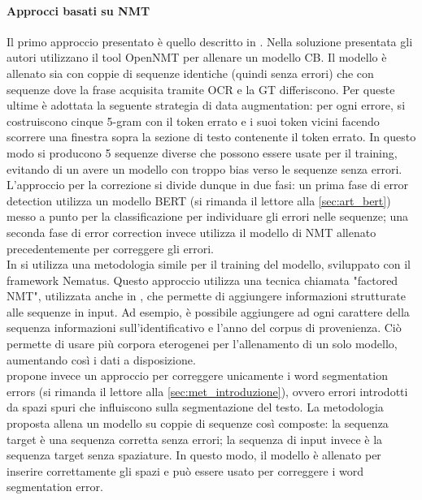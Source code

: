 \paragraph{Approcci basati su NMT}
Il primo approccio presentato è quello descritto in \cite{nguyen2020neural}. Nella soluzione presentata gli autori utilizzano il tool OpenNMT\cite{klein2017opennmt} per allenare un modello CB. Il modello è allenato sia con coppie di sequenze identiche (quindi senza errori) che con sequenze dove la frase acquisita tramite OCR e la GT differiscono. Per queste ultime è adottata la seguente strategia di data augmentation: per ogni errore, si costruiscono cinque 5-gram con il token errato e i suoi token vicini facendo scorrere una finestra sopra la sezione di testo contenente il token errato. In questo modo si producono 5 sequenze diverse che possono essere usate per il training, evitando di un avere un modello con troppo bias verso le sequenze senza errori. L'approccio per la correzione si divide dunque in due fasi: un prima fase di error detection utilizza un modello BERT (si rimanda il lettore alla \autoref{sec:art_bert}) messo a punto per la classificazione per individuare gli errori nelle sequenze; una seconda fase di error correction invece utilizza il modello di NMT allenato precedentemente per correggere gli errori.\\
In \cite{amrhein2018supervised} si utilizza una metodologia simile per il training del modello, sviluppato con il framework Nematus\cite{sennrich2017nematus}. Questo approccio utilizza una tecnica chiamata "factored NMT", utilizzata anche in \cite{nguyen2020neural}, che permette di aggiungere informazioni strutturate alle sequenze in input. Ad esempio, è possibile aggiungere ad ogni carattere della sequenza informazioni sull'identificativo e l'anno del corpus di provenienza. Ciò permette di usare più corpora eterogenei per l'allenamento di un solo modello, aumentando così i dati a disposizione.\\
\cite{nastase2018correction} propone invece un approccio per correggere unicamente i word segmentation errors (si rimanda il lettore alla \autoref{sec:met_introduzione}), ovvero errori introdotti da spazi spuri che influiscono sulla segmentazione del testo. La metodologia proposta allena un modello su coppie di sequenze così composte: la sequenza target è una sequenza corretta senza errori; la sequenza di input invece è la sequenza target senza spaziature. In questo modo, il modello è allenato per inserire correttamente gli spazi e può essere usato per correggere i word segmentation error.\\
